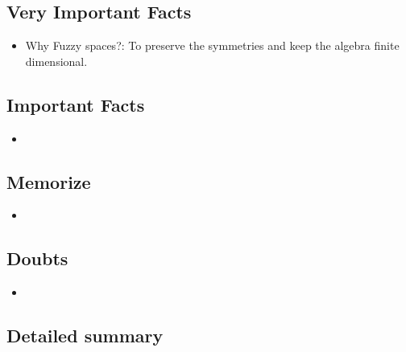\documentclass{article}
\begin{document}
\subsection{Very Important Facts}

    \begin{itemize}

    \item Why Fuzzy spaces?: To preserve the symmetries and keep the algebra finite dimensional.
    
    \end{itemize}

\subsection{Important Facts}

    \begin{itemize}

    \item 
    
    \end{itemize}

\subsection{Memorize}

    \begin{itemize}

    \item 
    
    \end{itemize}

\subsection{Doubts}

    \begin{itemize}

    \item 
    
    \end{itemize}

\subsection{Detailed summary}
\end{document}
